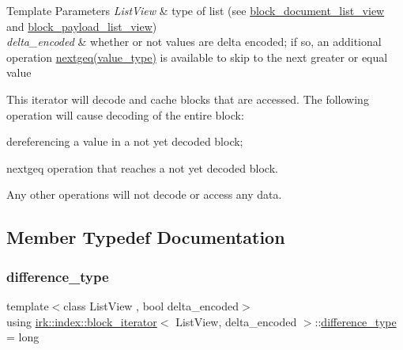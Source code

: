 \begin{DoxyTemplParams}{Template Parameters}
{\em List\+View} & type of list (see \mbox{\hyperlink{classirk_1_1index_1_1block__document__list__view}{block\+\_\+document\+\_\+list\+\_\+view}} and \mbox{\hyperlink{classirk_1_1index_1_1block__payload__list__view}{block\+\_\+payload\+\_\+list\+\_\+view}}) \\
\hline
{\em delta\+\_\+encoded} & whether or not values are delta encoded; if so, an additional operation {\ttfamily \mbox{\hyperlink{classirk_1_1index_1_1block__iterator_aae123dcccac278876262bf6514669e43}{nextgeq(value\+\_\+type)}}} is available to skip to the next greater or equal value\\
\hline
\end{DoxyTemplParams}
This iterator will decode and cache blocks that are accessed. The following operation will cause decoding of the entire block\+:
\begin{DoxyItemize}
\item dereferencing a value in a not yet decoded block;
\item {\ttfamily nextgeq} operation that reaches a not yet decoded block.
\end{DoxyItemize}

Any other operations will not decode or access any data. 

\subsection{Member Typedef Documentation}
\mbox{\label{classirk_1_1index_1_1block__iterator_a3a314c46329b349e7534670b21978ab6}} 
\subsubsection{\texorpdfstring{difference\+\_\+type}{difference\_type}}
{\footnotesize\ttfamily template$<$class List\+View , bool delta\+\_\+encoded$>$ \\
using \mbox{\hyperlink{classirk_1_1index_1_1block__iterator}{irk\+::index\+::block\+\_\+iterator}}$<$ List\+View, delta\+\_\+encoded $>$\+::\mbox{\hyperlink{classirk_1_1index_1_1block__iterator_a3a314c46329b349e7534670b21978ab6}{difference\+\_\+type}} =  long}


